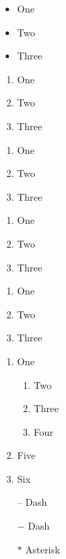 \documentclass{article}
\begin{document}
\begin{itemize}
	\item One
	\item Two
	\item Three
\end{itemize}


\begin{enumerate}
	\item One
	\item Two
	\item Three
\end{enumerate}

\begin{enumerate}[label=(\roman*)] 
	\item One
	\item Two
	\item Three
\end{enumerate}

\begin{enumerate}[label=(\arabic*)] 
	\item One
	\item Two
	\item Three
\end{enumerate}

\begin{enumerate}[label=(\alph*)] 
	\item One
	\item Two
	\item Three
\end{enumerate}

\begin{enumerate}
	\item One
    \begin{enumerate}
    	\item Two
        \item Three
        \item Four
    \end{enumerate}
    \item Five
    \item Six
\end{enumerate}




\begin{itemize}
	\item[--] Dash
    \item[$-$] Dash
    \item[$\ast$] Asterisk

%    
%
%
\end{itemize}
\end{document}
